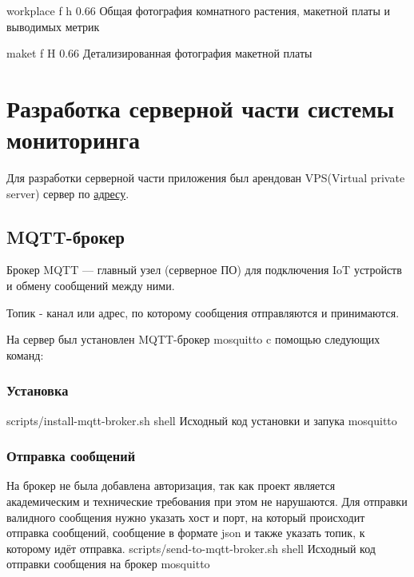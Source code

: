 \documentclass{bmstu}
\begin{document}
        {workplace} %
        {f} %
        {h} %
        {0.66\textwidth} %
        {Общая фотография комнатного растения, макетной платы и выводимых метрик} %

        {maket} %
        {f} %
        {H} %
        {0.66\textwidth} %
        {Детализированная фотография макетной платы} %

    \section{Разработка серверной части системы мониторинга}
    Для разработки серверной части приложения был арендован VPS(Virtual private server) сервер по \href{http://vm4481772.25ssd.had.wf:3000/d/ce3f4anwhavpce/plant-monitoring?from=now-15m&to=now&timezone=browser}{адресу}.

    \subsection{MQTT-брокер}
    Брокер MQTT — главный узел (серверное ПО) для подключения IoT устройств и обмену сообщений между ними.

    Топик - канал или адрес, по которому сообщения отправляются и принимаются.

    На сервер был установлен MQTT-брокер mosquitto \cite{ndunguInstallMosquittoMQTT}  c помощью следующих команд:

    \subsubsection{Установка}
        {scripts/install-mqtt-broker.sh} %
        {shell}
        {Исходный код установки и запука mosquitto} %

    \subsubsection{Отправка сообщений}
    На брокер не была добавлена авторизация, так как проект является академическим и технические требования при этом не нарушаются.
    Для отправки валидного сообщения нужно указать хост и порт, на который происходит отправка сообщений,
    сообщение в формате json и также указать топик, к которому идёт отправка.
        {scripts/send-to-mqtt-broker.sh} %
        {shell}
        {Исходный код отправки сообщения на брокер mosquitto} %
    
\end{document}
